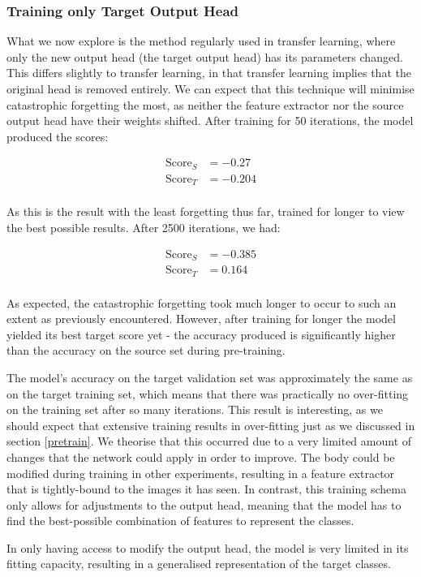 \documentclass{report}
\newcommand{\SCORE}[2]{
	\begin{align*}
	\text{Score}_S &= #1 \\
	\text{Score}_T &= #2 \\
	\end{align*}
}
\begin{document}
	\subsubsection{Training only Target Output Head}
	What we now explore is the method regularly used in transfer learning, where only the new output head (the target output head) has its parameters changed. This differs slightly to transfer learning, in that transfer learning implies that the original head is removed entirely. We can expect that this technique will minimise catastrophic forgetting the most, as neither the feature extractor nor the source output head have their weights shifted. After training for 50 iterations, the model produced the scores:
	\SCORE{-0.27}{-0.204}
	As this is the result with the least forgetting thus far, trained for longer to view the best possible results. After 2500 iterations, we had:
	\SCORE{-0.385}{0.164}
	As expected, the catastrophic forgetting took much longer to occur to such an extent as previously encountered. However, after training for longer the model yielded its best target score yet - the accuracy produced is significantly higher than the accuracy on the source set during pre-training.\par
	The model's accuracy on the target validation set was approximately the same as on the target training set, which means that there was practically no over-fitting on the training set after so many iterations. This result is interesting, as we should expect that extensive training results in over-fitting just as we discussed in section \ref{pretrain}. We theorise that this occurred due to a very limited amount of changes that the network could apply in order to improve. The body could be modified during training in other experiments, resulting in a feature extractor that is tightly-bound to the images it has seen. In contrast, this training schema only allows for adjustments to the output head, meaning that the model has to find the best-possible combination of features to represent the classes. \par
	In only having access to modify the output head, the model is very limited in its fitting capacity, resulting in a generalised representation of the target classes. \par
\end{document}
